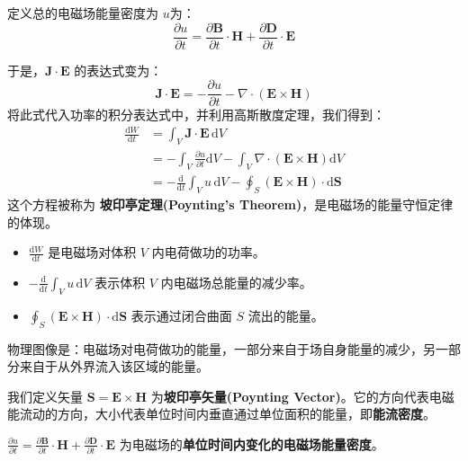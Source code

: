\documentclass[fontset=none]{ctexart}
\begin{document}
定义总的电磁场能量密度为 $u$为：
\begin{equation}
    \frac{\partial u}{\partial t} 
    = \frac{\partial \bm{B}}{\partial t} \cdot \bm{H} 
    + \frac{\partial \bm{D}}{\partial t} \cdot \bm{E}
\end{equation}

于是，$\bm{J} \cdot \bm{E}$ 的表达式变为：
\begin{equation}
    \bm{J} \cdot \bm{E} = - \frac{\partial u}{\partial t} - \nabla \cdot (\bm{E} \times \bm{H})
\end{equation}
将此式代入功率的积分表达式中，并利用高斯散度定理，我们得到：
\begin{equation}
\begin{aligned}
    \frac{\mathrm{d}W}{\mathrm{d}t} &= \int_V \bm{J} \cdot \bm{E} \, \mathrm{d}V \\
    &= -\int_V \frac{\partial u}{\partial t} \mathrm{d}V - \int_V \nabla \cdot (\bm{E} \times \bm{H}) \mathrm{d}V \\
    &= -\frac{\mathrm{d}}{\mathrm{d}t}\int_V u \, \mathrm{d}V - \oint_S (\bm{E} \times \bm{H}) \cdot \mathrm{d}\bm{S}
\end{aligned}
\end{equation}
这个方程被称为 \textbf{坡印亭定理(Poynting's Theorem)}，是电磁场的能量守恒定律的体现。
\begin{itemize}
    \item $\frac{\mathrm{d}W}{\mathrm{d}t}$ 是电磁场对体积 $V$ 内电荷做功的功率。
    \item $-\frac{\mathrm{d}}{\mathrm{d}t}\int_V u \, \mathrm{d}V$ 表示体积 $V$ 内电磁场总能量的减少率。
    \item $\oint_S (\bm{E} \times \bm{H}) \cdot \mathrm{d}\bm{S}$ 表示通过闭合曲面 $S$ 流出的能量。
\end{itemize}
物理图像是：电磁场对电荷做功的能量，一部分来自于场自身能量的减少，另一部分来自于从外界流入该区域的能量。

\begin{definition}[坡印亭矢量与能量流密度]
我们定义矢量 $\bm{S} = \bm{E} \times \bm{H}$ 为\textbf{坡印亭矢量(Poynting Vector)}。它的方向代表电磁能流动的方向，大小代表单位时间内垂直通过单位面积的能量，即\textbf{能流密度}。
\end{definition}

\begin{definition}[单位时间内变化的电磁场能量密度]
$\frac{\partial u}{\partial t} 
= \frac{\partial \bm{B}}{\partial t} \cdot \bm{H} 
+ \frac{\partial \bm{D}}{\partial t} \cdot \bm{E}$ 
为电磁场的\textbf{单位时间内变化的电磁场能量密度}。
\end{definition}
\end{document}
